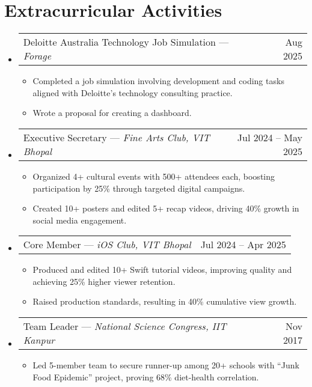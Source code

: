 \documentclass[letterpaper,10pt]{article}
\makeatletter
\newcommand{\resumeItem}[1]{
  \item\small{
    {#1 \vspace{-2pt}}
  }
}
\newcommand{\resumeProjectHeading}[2]{
    \item
    \begin{tabular*}{0.97\textwidth}{l@{\extracolsep{\fill}}r}
      \small#1 & #2 \\
    \end{tabular*}\vspace{-7pt}
}
\newcommand{\resumeSubHeadingListStart}{\begin{itemize}[leftmargin=0.15in, label={}]}
\newcommand{\resumeSubHeadingListEnd}{\end{itemize}}
\newcommand{\resumeItemListStart}{\begin{itemize}}
\newcommand{\resumeItemListEnd}{\end{itemize}\vspace{-5pt}}
\makeatother
\begin{document}
\section{Extracurricular Activities}
\resumeSubHeadingListStart
\resumeProjectHeading
  {{Deloitte Australia Technology Job Simulation} — \emph{Forage}}{Aug 2025}
  \resumeItemListStart
    \resumeItem{Completed a job simulation involving development and coding tasks aligned with Deloitte’s technology consulting practice.}
    \resumeItem{Wrote a proposal for creating a dashboard.}
  \resumeItemListEnd
  \resumeProjectHeading
    {{Executive Secretary} — \emph{Fine Arts Club, VIT Bhopal}}{Jul 2024 – May 2025}
    \resumeItemListStart
      \resumeItem{Organized 4+ cultural events with 500+ attendees each, boosting participation by 25\% through targeted digital campaigns.}
      \resumeItem{Created 10+ posters and edited 5+ recap videos, driving 40\% growth in social media engagement.}
    \resumeItemListEnd
    
  \resumeProjectHeading
    {{Core Member} — \emph{iOS Club, VIT Bhopal}}{Jul 2024 – Apr 2025}
    \resumeItemListStart
      \resumeItem{Produced and edited 10+ Swift tutorial videos, improving quality and achieving 25\% higher viewer retention.}
      \resumeItem{Raised production standards, resulting in 40\% cumulative view growth.}
    \resumeItemListEnd
    
  \resumeProjectHeading
    {{Team Leader} — \emph{National Science Congress, IIT Kanpur}}{Nov 2017}
    \resumeItemListStart
      \resumeItem{Led 5-member team to secure runner-up among 20+ schools with “Junk Food Epidemic” project, proving 68\% diet-health correlation.}
    \resumeItemListEnd
\resumeSubHeadingListEnd
\end{document}
